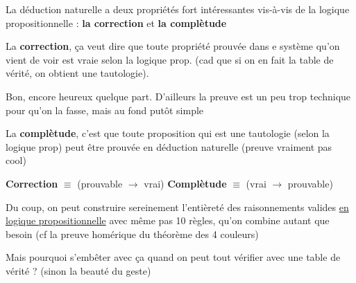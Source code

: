 

\begin{frame}
	  
	La déduction naturelle a deux propriétés fort intéressantes vis-à-vis de la logique propositionnelle : \textbf{la correction} et \textbf{la complètude}\pause\newline
	
	La \textbf{correction}, ça veut dire que toute propriété prouvée dans e système qu'on vient de voir est vraie selon la logique prop. (cad que si on en fait la table de vérité, on obtient une tautologie). \pause\newline
	
	Bon, encore heureux quelque part. D'ailleurs la preuve est un peu trop technique pour qu'on la fasse, mais au fond putôt simple
	
	
	  

\end{frame}


\begin{frame}
	  
	La \textbf{complètude}, c'est que toute proposition qui est une tautologie (selon la logique prop) peut être prouvée en déduction naturelle \pause (preuve vraiment pas cool)\pause\newline
	
	\textbf{Correction} $\equiv$ (prouvable $\rightarrow$ vrai)\newline
	\textbf{Complètude} $\equiv$ (vrai $\rightarrow$ prouvable)\newline\pause
	
	Du coup, on peut construire sereinement l'entièreté des raisonnements valides \underline{en logique propositionnelle} avec même pas 10 règles, qu'on combine autant que besoin (cf la preuve homérique du théorème des 4 couleurs)\pause\newline
	
	Mais pourquoi s'embêter avec ça quand on peut tout vérifier avec une table de vérité ? \pause (sinon la beauté du geste)
		  

\end{frame}


